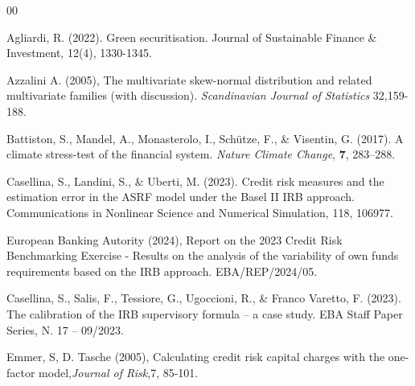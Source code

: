 \documentclass[preprint,12pt]{article}
\begin{document}

\begin{thebibliography}{00}

  Agliardi, R. (2022). Green securitisation. Journal of Sustainable Finance \& Investment, 12(4), 1330-1345.


 Azzalini A. (2005),  The multivariate skew-normal distribution and related multivariate families (with discussion). \emph{Scandinavian Journal of Statistics} 32,159-188.

Battiston, S., Mandel, A., Monasterolo, I., Sch\"utze, F., \& Visentin, G. (2017). A climate stress-test of the financial system. \textit{Nature Climate Change}, \textbf{7}, 283--288.

 Casellina, S., Landini, S., \& Uberti, M. (2023). Credit risk measures and the estimation error in the ASRF model under the Basel II IRB approach. Communications in Nonlinear Science and Numerical Simulation, 118, 106977.

 European Banking Autority (2024), Report on the 2023 Credit Risk Benchmarking Exercise - 
Results on the analysis of the variability of own
funds requirements based on the IRB approach.
EBA/REP/2024/05. %

 Casellina, S., Salis, F., Tessiore, G., Ugoccioni, R., \& Franco Varetto, F. (2023). The calibration of the IRB supervisory formula – a case study.
EBA Staff Paper Series, N. 17 – 09/2023.


Emmer, S, D. Tasche (2005), Calculating credit risk capital charges with the one-factor model,\emph{Journal of Risk},7, 85-101.


\end{thebibliography}
\end{document}
